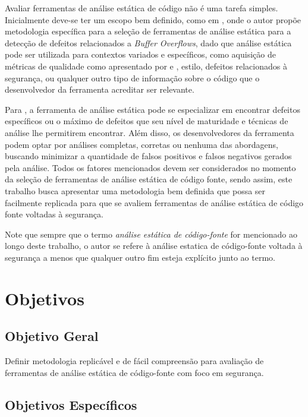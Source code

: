 Avaliar ferramentas de análise estática de código não é uma tarefa simples.
Inicialmente deve-se ter um escopo bem definido, como em \cite{harvard}, onde o autor propõe metodologia específica para a seleção de ferramentas de análise estática para a detecção de defeitos relacionados a \textit{Buffer Overflows}, dado que análise estática pode ser utilizada para contextos variados e específicos, como aquisição de métricas de qualidade como apresentado por \cite{meirelles2013} e \cite{analizoartigo}, estilo, defeitos relacionados à segurança, ou qualquer outro tipo de informação sobre o código que o desenvolvedor da ferramenta acreditar ser relevante.

Para \cite{secure_programming}, a ferramenta de análise estática pode se especializar em encontrar defeitos específicos ou o máximo de defeitos que seu nível de maturidade e técnicas de análise lhe permitirem encontrar. Além disso, os desenvolvedores da ferramenta podem optar por análises completas, corretas ou nenhuma das abordagens, buscando minimizar a quantidade de falsos positivos e falsos negativos gerados pela análise. Todos os fatores mencionados devem ser considerados no momento da seleção de ferramentas de análise estática de código fonte, sendo assim, este trabalho busca apresentar uma metodologia bem definida que possa ser facilmente replicada para que se avaliem ferramentas de análise estática de código fonte voltadas à segurança.

Note que sempre que o termo \textit{análise estática de código-fonte} for mencionado ao longo deste trabalho, o autor se refere à análise estatica de código-fonte voltada à segurança a menos que qualquer outro fim esteja explícito junto ao termo.

\section{Objetivos}
\subsection{Objetivo Geral}

Definir metodologia replicável e de fácil compreensão para avaliação de ferramentas de análise estática de código-fonte com foco em segurança.

\subsection{Objetivos Específicos}

